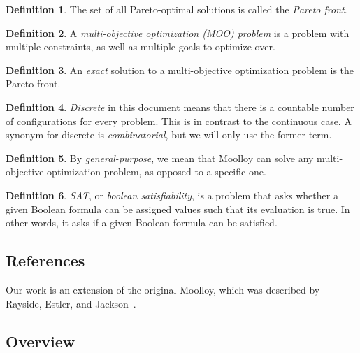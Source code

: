 \documentclass[11pt]{article}
\theoremstyle{definition}
\newtheorem{mydef}{Definition}
\begin{document}
\begin{mydef}
The set of all Pareto-optimal solutions is called the
\textit{Pareto front}.
\end{mydef}

\begin{mydef}
A \textit{multi-objective optimization (MOO) problem} is a problem with
multiple constraints, as well as multiple goals to optimize over.
\end{mydef}

\begin{mydef}
An \textit{exact} solution to a multi-objective optimization problem is
the Pareto front.
\end{mydef}

\begin{mydef}
\textit{Discrete} in this document means that there is a countable
number of configurations for every problem. This is in contrast to the
continuous case. A synonym for discrete is \textit{combinatorial}, but
we will only use the former term.  \end{mydef}

\begin{mydef}
By \textit{general-purpose}, we mean that Moolloy can solve any
multi-objective optimization problem, as opposed to a specific one.
\end{mydef}

\begin{mydef}
\textit{SAT}, or \textit{boolean satisfiability}, is a problem that
asks whether a given Boolean formula can be assigned values such that
its evaluation is true. In other words, it asks if a given Boolean
formula can be satisfied.
\end{mydef}

\subsection{References}\label{sec:ref}

Our work is an extension of the original Moolloy, which was described
by Rayside, Estler, and Jackson~\cite{ref:Rayside09}.

\subsection{Overview}\label{sec:overview}
\end{document}
